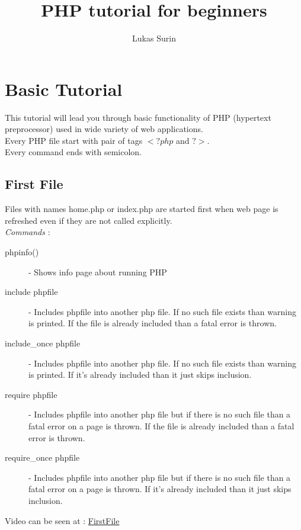 \documentclass{article}
\title{PHP tutorial for beginners}
\author{Lukas Surin}
\begin{document}
\maketitle

\section{Basic Tutorial}
This tutorial will lead you through basic functionality of PHP (hypertext preprocessor) used in wide variety of web applications. \\
Every PHP file start with pair of tags $<?php$ and $?>$. \\
Every command ends with semicolon. \\

\subsection{First File}
Files with names home.php or index.php are started first when web page is refreshed even if they are not called explicitly. \\
\textit{Commands} : 
\begin{description}
\item[\hspace{1cm} phpinfo()] - Shows info page about running PHP 
\item[\hspace{1cm} include phpfile] - Includes phpfile into another php file. If no such file exists than warning is printed. If the file is already included than a fatal error is thrown.
\item[\hspace{1cm} include\_once phpfile] - Includes phpfile into another php file. If no such file exists than warning is printed. If it's already included than it just skips inclusion.
\item[\hspace{1cm} require phpfile] - Includes phpfile into another php file but if there is no such file than a fatal error on a page is thrown. If the file is already included than a fatal error is thrown.
\item[\hspace{1cm} require\_once phpfile] - Includes phpfile into another php file but if there is no such file than a fatal error on a page is thrown. If it's already included than it just skips inclusion.
\end{description}
Video can be seen at : \href{http://youtu.be/QRmmISj6Rrw}{FirstFile}
\end{document}
